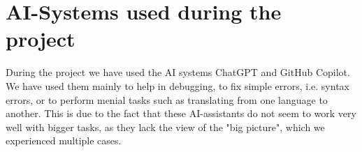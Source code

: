\section{AI-Systems used during the project}

During the project we have used the AI systems ChatGPT and GitHub Copilot.
We have used them mainly to help in debugging, to fix simple errors, i.e. syntax errors, or to perform menial tasks such as translating from one language to another.
This is due to the fact that these AI-assistants do not seem to work very well with bigger tasks, as they lack the view of the "big picture", which we experienced multiple cases.
%

